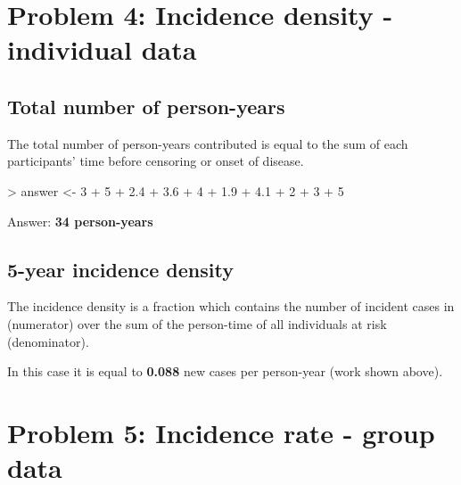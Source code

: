 \documentclass[12pt]{article}
\begin{document}
\newpage
\section*{Problem 4: Incidence density - individual data}

\subsection*{Total number of person-years}

The total number of person-years contributed is equal to the sum of each participants' time before censoring or onset of disease.

\begin{Schunk}
\begin{Sinput}
> answer <- 3 + 5 + 2.4 + 3.6 + 4 + 1.9 + 4.1 + 2 + 3 + 5
\end{Sinput}
\end{Schunk}
Answer: \textbf{34 person-years}

\subsection*{5-year incidence density}

The incidence density is a fraction which contains the number of incident cases in (numerator) over the sum of the person-time of all individuals at risk (denominator).  

\begin{Schunk}
\end{Schunk}


In this case it is equal to \textbf{0.088} new cases per person-year (work shown above).

\section*{Problem 5: Incidence rate - group data}
\end{document}
